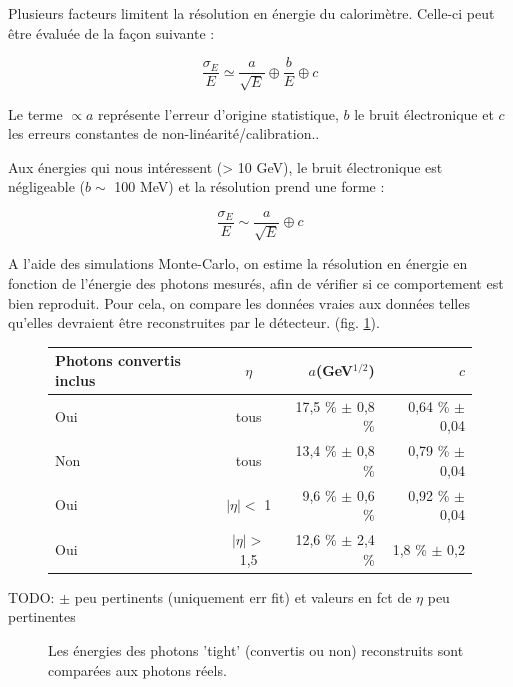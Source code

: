 \documentclass[11pt]{article} %
\begin{document}
Plusieurs facteurs limitent la résolution en énergie du calorimètre. Celle-ci peut être évaluée de la façon suivante :

\begin{equation}
\dfrac{\sigma_E}{E} \simeq \dfrac{a}{\sqrt{E}} \oplus \dfrac{b}{E} \oplus c
\end{equation}

Le terme $\propto a$ représente l'erreur d'origine statistique, $b$ le bruit électronique et $c$ les erreurs constantes de non-linéarité/calibration..

Aux énergies qui nous intéressent (> 10 GeV), le bruit électronique est négligeable ($b \sim$ 100 MeV) et la résolution prend une forme :

\begin{equation}
\dfrac{\sigma_E}{E} \sim \dfrac{a}{\sqrt{E}} \oplus c
\end{equation}

A l'aide des simulations Monte-Carlo, on estime la résolution en énergie en fonction de l'énergie des photons mesurés, afin de vérifier si ce comportement est bien reproduit. Pour cela, on compare les données vraies aux données telles qu'elles devraient être reconstruites par le détecteur. (fig. \ref{fig:resolution_energie_photons}).

\begin{figure}
\centering
\begin{tabular}{|l|c|r|r|} 
   \hline
   Photons convertis inclus &$\eta$ & $a$(GeV${ }^{1/2}$) & $c$ \\
    \hline
   Oui & tous & 17,5 \% $\pm$ 0,8 \% &0,64 \% $\pm$ 0,04  \\
  \hline
   Non & tous & 13,4 \% $\pm$ 0,8 \% &0,79 \% $\pm$ 0,04  \\
  \hline
   Oui &$|\eta| < $ 1 & 9,6 \% $\pm$ 0,6 \% &0,92 \% $\pm$ 0,04  \\
\hline
   Oui & $|\eta| >$ 1,5 & 12,6 \% $\pm$ 2,4 \% &1,8 \% $\pm$ 0,2  \\
\hline
\end{tabular}
\end{figure}

TODO: $\pm$ peu pertinents (uniquement err fit) et valeurs en fct de $\eta$ peu pertinentes



\begin{figure}[H]
\centering
  \caption{\label{fig:resolution_energie_photons} Les énergies des photons 'tight' (convertis ou non) reconstruits sont comparées aux photons réels. }
 \resizebox{.9\linewidth}{!}{}
\end{figure}
\end{document}
